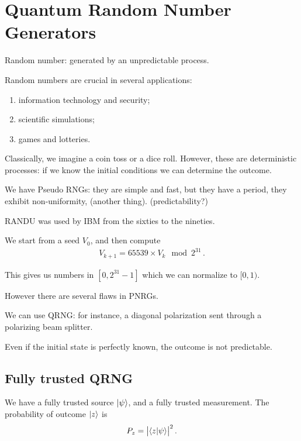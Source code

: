 \documentclass[main.tex]{subfiles}
\begin{document}


\section{Quantum Random Number Generators}

Random number: generated by an unpredictable process. 

Random numbers are crucial in several applications: 
\begin{enumerate}
    \item information technology and security;
    \item scientific simulations;
    \item games and lotteries.
\end{enumerate}

Classically, we imagine a coin toss or a dice roll. 
However, these are deterministic processes: if we know the initial conditions we can determine the outcome. 

We have Pseudo RNGs: they are simple and fast, but they have a period, they exhibit non-uniformity, (another thing). (predictability?)

RANDU was used by IBM from the sixties to the nineties. 

We start from a seed \(V_0 \), and then compute 
%
\begin{align}
V_{k+1} = 65539 \times V_k \mod 2^{31}
\,.
\end{align}

This gives us numbers in \([0, 2^{31}-1]\) which we can normalize to \([0, 1)\). 

However there are several flaws in PNRGs. 

We can use QRNG: for instance, a diagonal polarization sent through a polarizing beam splitter. 

Even if the initial state is perfectly known, the outcome is not predictable. 

\subsection{Fully trusted QRNG}

We have a fully trusted source \(\ket{\psi }\), and a fully trusted measurement. The probability of outcome \(\ket{z}\) is 
%
\begin{align}
P_z = \abs{\braket{z}{\psi }}^2
\,.
\end{align}
\end{document}
